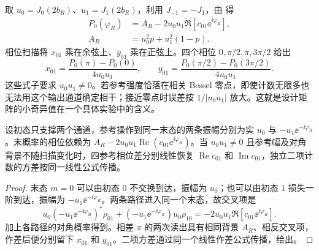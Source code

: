 取 $u_0=J_0(2b_R)$、$u_1=J_1(2b_R)$，利用 $J_{-1}=-J_1$，由 得
\begin{equation}
 \begin{aligned}
 P_0(\varphi_R)&=A_R-2u_0u_1\Re[c_{01}\ee^{\ii\varphi_R}],\\
 A_R&=u_0^2p+u_1^2(1-p).
 \end{aligned}
 \label{eq:electron-reference-two-channel-fringe}
\end{equation}
相位扫描将 $x_{01}$ 乘在余弦上、$y_{01}$ 乘在正弦上。四个相位 $0,\pi/2,\pi,3\pi/2$ 给出
\begin{equation}
 x_{01}=\frac{P_0(\pi)-P_0(0)}{4u_0u_1},\qquad
 y_{01}=\frac{P_0(\pi/2)-P_0(3\pi/2)}{4u_0u_1}.
 \label{eq:electron-reference-four-phase-inversion}
\end{equation}
这些式子要求 $u_0u_1\neq0$。若参考强度恰落在相关 Bessel 零点，即使计数无限多也无法用这个输出通道确定相干；接近零点时误差按 $1/|u_0u_1|$ 放大。这就是设计矩阵的小奇异值在一个具体实验中的含义。

\begin{lemma}[两通道参考干涉的正交相干读出]
设初态只支撑两个通道，参考操作到同一末态的两条振幅分别为实 $u_0$ 与 $-u_1\ee^{-\ii\varphi_R}$。末概率的相位依赖为 $A_R-2u_0u_1\operatorname{Re}(c_{01}\ee^{\ii\varphi_R})$。当 $u_0u_1\ne0$ 且参考幅及对角背景不随扫描变化时，四参考相位差分别线性恢复 $\operatorname{Re}c_{01}$ 和 $\operatorname{Im}c_{01}$，独立二项计数的方差按同一线性公式传播。
\end{lemma}
\begin{proof}
末态 $m=0$ 可以由初态 $0$ 不交换到达，振幅为 $u_0$；也可以由初态 $1$ 损失一阶到达，振幅为 $-u_1\ee^{-\ii\varphi_R}$。两条路径进入同一个末态，故交叉项是
\begin{equation*}
 u_0(-u_1\ee^{-\ii\varphi_R})^*\rho_{01}
 +(-u_1\ee^{-\ii\varphi_R})u_0\rho_{10}
 =-2u_0u_1\Re[c_{01}\ee^{\ii\varphi_R}].
\end{equation*}
加上各路径的对角概率得到。相差 $\pi$ 的两次读出具有相同背景 $A_R$、相反交叉项，作差后便分别留下 $x_{01}$ 和 $y_{01}$。二项方差通过同一个线性作差公式传播，给出。
\end{proof}


